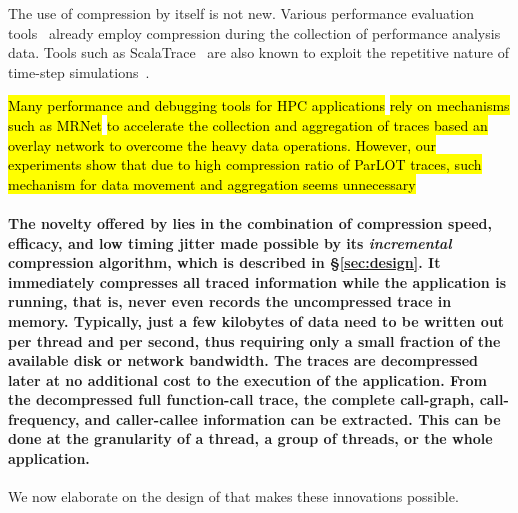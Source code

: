 The use of compression by itself is not new.
Various performance evaluation tools~\cite{tau,scorep,eventflowgraph} 
already employ compression during the collection
of performance analysis data.
%
Tools such as ScalaTrace~\cite{scalatrace}
are also known to exploit
the repetitive nature of time-step simulations~\cite{freitag}. %

\hl{
Many performance and debugging tools for HPC applications} \cite{stat,taumrnet}\hl{ rely on mechanisms such as MRNet}\cite{mrnet}\hl{ to accelerate the collection and aggregation of traces based an overlay network to overcome the heavy data operations. However, our experiments show that due to high compression ratio of ParLOT traces, such mechanism for data movement and aggregation seems unnecessary}

\paragraph{The novelty offered by \parlot lies in the combination of compression
speed, efficacy, and low timing jitter
made possible by its {\em incremental}
compression algorithm, which is
described in \S\ref{sec:design}.
%
It immediately compresses all traced information while the application is running, that is, \parlot never even records the uncompressed trace in memory. 
%
Typically, just a few kilobytes of data need to be written out per thread and per second, thus requiring only a small fraction of the available disk or network bandwidth. 
%
The traces are decompressed later at no additional cost to the execution of the application. 
%
From the decompressed full function-call trace, the complete call-graph, 
call-frequency, and caller-callee information can be extracted. 
%
This can be done at the granularity of a thread, a group of threads, or the whole application.
}
%
We now elaborate on the design of \parlot that makes
these innovations possible.







